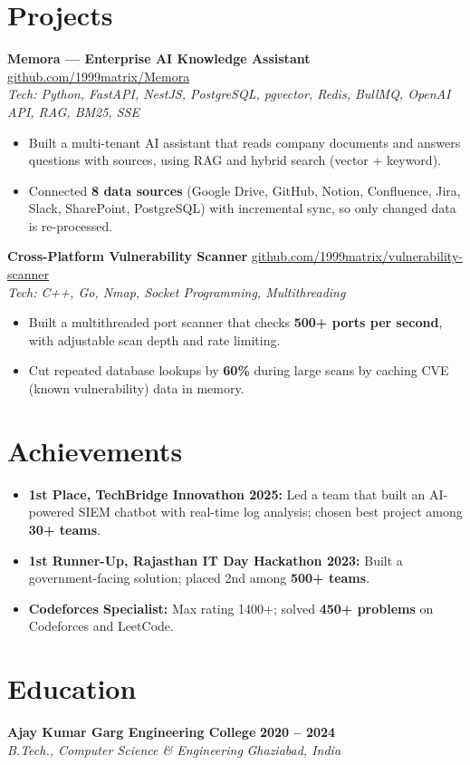 \documentclass[10pt,letterpaper]{article}
\newcommand{\resumeSubheading}[4]{
    \textbf{#1} \hfill \textbf{#2}\\
    \textit{#3} \hfill \textit{#4}

}
\newcommand{\resumeProject}[3]{
    \textbf{#1} \hfill \href{https://#3}{#3} \\
    \textit{Tech: #2}

}
\newcommand{\resumeItem}[1]{
    \item #1
}
\begin{document}
\section{Projects}

\resumeProject
    {Memora --- Enterprise AI Knowledge Assistant}
    {Python, FastAPI, NestJS, PostgreSQL, pgvector, Redis, BullMQ, OpenAI API, RAG, BM25, SSE}
    {github.com/1999matrix/Memora}

\begin{itemize}
    \resumeItem{Built a multi-tenant AI assistant that reads company documents and answers questions with sources, using RAG and hybrid search (vector + keyword).}

    \resumeItem{Connected \textbf{8 data sources} (Google Drive, GitHub, Notion, Confluence, Jira, Slack, SharePoint, PostgreSQL) with incremental sync, so only changed data is re-processed.}
\end{itemize}

\vspace{1pt}

\resumeProject
    {Cross-Platform Vulnerability Scanner}
    {C++, Go, Nmap, Socket Programming, Multithreading}
    {github.com/1999matrix/vulnerability-scanner}

\begin{itemize}
    \resumeItem{Built a multithreaded port scanner that checks \textbf{500+ ports per second}, with adjustable scan depth and rate limiting.}

    \resumeItem{Cut repeated database lookups by \textbf{60\%} during large scans by caching CVE (known vulnerability) data in memory.}
\end{itemize}

\section{Achievements}

\begin{itemize}
    \resumeItem{\textbf{1st Place, TechBridge Innovathon 2025:} Led a team that built an AI-powered SIEM chatbot with real-time log analysis; chosen best project among \textbf{30+ teams}.}

    \resumeItem{\textbf{1st Runner-Up, Rajasthan IT Day Hackathon 2023:} Built a government-facing solution; placed 2nd among \textbf{500+ teams}.}

    \resumeItem{\textbf{Codeforces Specialist:} Max rating 1400+; solved \textbf{450+ problems} on Codeforces and LeetCode.}
\end{itemize}

\section{Education}

\resumeSubheading
    {Ajay Kumar Garg Engineering College}
    {2020 -- 2024}
    {B.Tech., Computer Science \& Engineering}
    {Ghaziabad, India}
\end{document}
